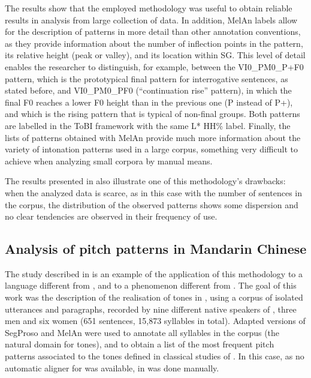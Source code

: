 \documentclass[output=paper]{langsci/langscibook}
\begin{document}
The results show that the employed methodology was useful to obtain reliable results in  analysis from large collection of data. In addition, MelAn labels allow for the description of  patterns in more detail than other annotation conventions, as they provide information about the number of inflection points in the pattern, its relative height (peak or valley), and its location within SG. This level of detail enables the researcher to distinguish, for example, between the VI0\_PM0\_P+F0 pattern, which is the prototypical final pattern for interrogative sentences, as stated before, and VI0\_PM0\_PF0 (``continuation rise'' pattern), in which the final F0 reaches a lower F0 height than in the previous one (P instead of P+), and which is the rising pattern that is typical of non-final  groups. Both patterns are labelled in the ToBI framework with the same L* HH\% label. Finally, the lists of patterns obtained with MelAn provide much more information about the variety of intonation patterns used in a large corpus, something very difficult to achieve when analyzing small corpora by manual means.

The results presented in  also illustrate one of this methodology’s drawbacks: when the analyzed data is scarce, as in this case with the number of  sentences in the corpus, the distribution of the observed patterns shows some dispersion and no clear tendencies are observed in their frequency of use.

\subsection{Analysis of pitch patterns in Mandarin Chinese}\largerpage[2.5]

The study described in \citet{Yao2015} is an example of the application of this methodology to a language different from , and to a  phenomenon different from . The goal of this work was the description of the  realisation of tones in  , using a corpus of isolated utterances and paragraphs, recorded by nine different native speakers of  , three men and six women (651 sentences, 15,873 syllables in total). Adapted versions of SegProso and MelAn were used to annotate all syllables in the corpus (the natural domain for tones), and to obtain a list of the most frequent pitch patterns associated to the tones defined in classical studies of  . In this case, as no automatic  aligner for   was available,  in  was done manually.
\end{document}
